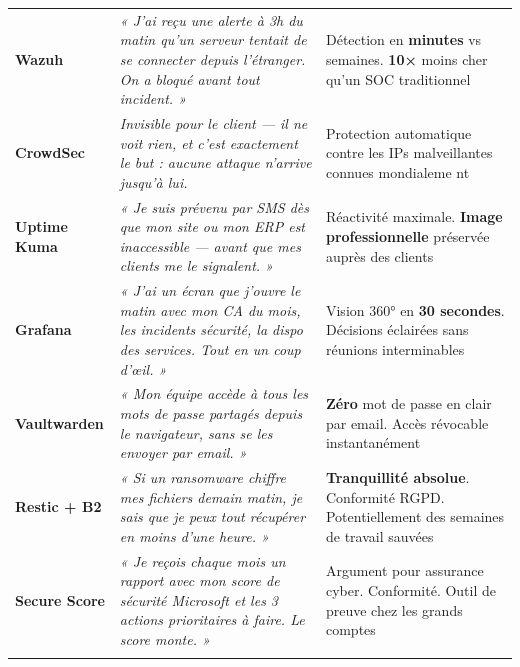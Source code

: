 \begin{footnotesize}
\begin{longtable}{>{\bfseries}p{2.2cm} p{6.8cm} p{5.0cm}}
\rowcolor{rowgray}
Wazuh &
\textit{« J'ai reçu une alerte à 3h du matin qu'un serveur tentait de se connecter depuis l'étranger. On a bloqué avant tout incident. »} &
Détection en \textbf{minutes} vs semaines. \textbf{10×} moins cher qu'un SOC traditionnel \\

\rowcolor{colgreen!5}
CrowdSec &
\textit{Invisible pour le client — il ne voit rien, et c'est exactement le but : aucune attaque n'arrive jusqu'à lui.} &
Protection automatique contre les IPs malveillantes connues mondialeme nt \\

\rowcolor{rowgray}
Uptime Kuma &
\textit{« Je suis prévenu par SMS dès que mon site ou mon ERP est inaccessible — avant que mes clients me le signalent. »} &
Réactivité maximale. \textbf{Image professionnelle} préservée auprès des clients \\

\rowcolor{colgreen!5}
Grafana &
\textit{« J'ai un écran que j'ouvre le matin avec mon CA du mois, les incidents sécurité, la dispo des services. Tout en un coup d'œil. »} &
Vision 360° en \textbf{30 secondes}. Décisions éclairées sans réunions interminables \\

\rowcolor{rowgray}
Vaultwarden &
\textit{« Mon équipe accède à tous les mots de passe partagés depuis le navigateur, sans se les envoyer par email. »} &
\textbf{Zéro} mot de passe en clair par email. Accès révocable instantanément \\

\rowcolor{colgreen!5}
Restic + B2 &
\textit{« Si un ransomware chiffre mes fichiers demain matin, je sais que je peux tout récupérer en moins d'une heure. »} &
\textbf{Tranquillité absolue}. Conformité RGPD. Potentiellement des semaines de travail sauvées \\

\rowcolor{rowgray}
Secure Score &
\textit{« Je reçois chaque mois un rapport avec mon score de sécurité Microsoft et les 3 actions prioritaires à faire. Le score monte. »} &
Argument pour assurance cyber. Conformité. Outil de preuve chez les grands comptes \\

\multicolumn{3}{l}{\cellcolor{navylight!12}\textcolor{navylight}{\textbf{$\triangleright$ Options Premium — Valeur perçue élevée}}} \\[2pt]


\end{longtable}
\end{footnotesize}

